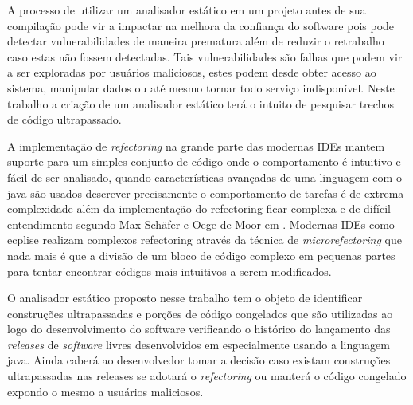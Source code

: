 A processo de utilizar um analisador estático em um projeto antes de sua compilação pode vir a impactar na melhora da confiança do software pois pode detectar vulnerabilidades de maneira prematura além de reduzir o retrabalho caso estas não fossem detectadas. Tais vulnerabilidades são falhas que podem vir a ser exploradas por usuários maliciosos, estes podem desde obter acesso ao sistema, manipular dados ou até mesmo tornar todo serviço indisponível. Neste trabalho a criação de um analisador estático terá o intuito de pesquisar trechos de código ultrapassado.

A implementação de {\it refectoring} na grande parte das modernas IDEs mantem suporte para um simples conjunto de código onde o comportamento é intuitivo e fácil de ser analisado,  quando características avançadas de uma linguagem com o java são usados descrever precisamente o comportamento de tarefas é de extrema complexidade além da implementação do refectoring ficar complexa e de difícil entendimento segundo Max Schäfer e Oege de Moor em  \cite{Schaefer:ACM2010}. Modernas IDEs como ecplise realizam complexos refectoring através da técnica de {\it microrefectoring} que nada mais é que a divisão de um bloco de código complexo em pequenas partes para tentar encontrar códigos mais intuitivos a serem modificados.

O analisador estático proposto nesse trabalho tem o objeto de identificar construções ultrapassadas e porções de código congelados que são utilizadas ao logo do desenvolvimento do software verificando o histórico do lançamento das {\it releases} de {\it software} livres desenvolvidos em especialmente usando a linguagem java. Ainda caberá ao desenvolvedor tomar a decisão caso existam construções ultrapassadas nas releases se adotará o {\it refectoring} ou manterá o código congelado expondo o mesmo a usuários maliciosos.
